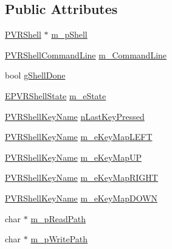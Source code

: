 \subsection*{Public Attributes}
\begin{DoxyCompactItemize}
\item 
\hyperlink{class_p_v_r_shell}{P\+V\+R\+Shell} $\ast$ \hyperlink{class_p_v_r_shell_init_aa389ae762133234a0cb9b6c6c832d6f7}{m\+\_\+p\+Shell}
\item 
\hyperlink{class_p_v_r_shell_command_line}{P\+V\+R\+Shell\+Command\+Line} \hyperlink{class_p_v_r_shell_init_a399bddf1f8ff7f9608102e8f7fb4e90d}{m\+\_\+\+Command\+Line}
\item 
bool \hyperlink{class_p_v_r_shell_init_a62a5a14abcdc01fe0c73467631acef25}{g\+Shell\+Done}
\item 
\hyperlink{_p_v_r_shell_impl_8h_a32b814c861a817fdf2ea7a65f5382afd}{E\+P\+V\+R\+Shell\+State} \hyperlink{class_p_v_r_shell_init_a90d20c5da07f3dd2cae158c36e9acd48}{m\+\_\+e\+State}
\item 
\hyperlink{_p_v_r_shell_8h_afe6e702981239131fb8bb06574e35159}{P\+V\+R\+Shell\+Key\+Name} \hyperlink{class_p_v_r_shell_init_a5cc91fe74513ac587058d5f796d6f921}{n\+Last\+Key\+Pressed}
\item 
\hyperlink{_p_v_r_shell_8h_afe6e702981239131fb8bb06574e35159}{P\+V\+R\+Shell\+Key\+Name} \hyperlink{class_p_v_r_shell_init_a37c3b8166521548170e4e91684bd5cfa}{m\+\_\+e\+Key\+Map\+L\+E\+F\+T}
\item 
\hyperlink{_p_v_r_shell_8h_afe6e702981239131fb8bb06574e35159}{P\+V\+R\+Shell\+Key\+Name} \hyperlink{class_p_v_r_shell_init_a9b2bde4498986ac674329b3b7aba6e53}{m\+\_\+e\+Key\+Map\+U\+P}
\item 
\hyperlink{_p_v_r_shell_8h_afe6e702981239131fb8bb06574e35159}{P\+V\+R\+Shell\+Key\+Name} \hyperlink{class_p_v_r_shell_init_a22f524c93c0bfbf5ae7f5d90be3b1290}{m\+\_\+e\+Key\+Map\+R\+I\+G\+H\+T}
\item 
\hyperlink{_p_v_r_shell_8h_afe6e702981239131fb8bb06574e35159}{P\+V\+R\+Shell\+Key\+Name} \hyperlink{class_p_v_r_shell_init_abd7862e314bbcd4c462c099c339bc524}{m\+\_\+e\+Key\+Map\+D\+O\+W\+N}
\item 
char $\ast$ \hyperlink{class_p_v_r_shell_init_a72008e1300f60528240eb8cd3fb5d626}{m\+\_\+p\+Read\+Path}
\item 
char $\ast$ \hyperlink{class_p_v_r_shell_init_a93274d3437ec846765cb0257218909de}{m\+\_\+p\+Write\+Path}
\end{DoxyCompactItemize}
